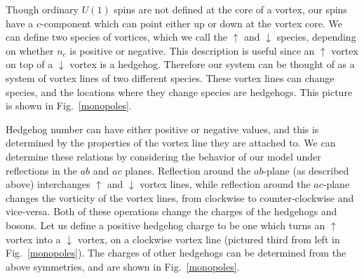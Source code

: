 \documentclass[prb,twocolumn]{revtex4-1}
\begin{document}

Though ordinary $U(1)$ spins are not defined at the core of a vortex, our spins have a $c$-component which can point either up or down at the vortex core. We can define two species of vortices, which we call the $\uparrow$ and $\downarrow$ species, depending on whether $n_c$ is positive or negative. This description is useful since an $\uparrow$ vortex on top of a $\downarrow$ vortex is a hedgehog. Therefore our system can be thought of as a system of vortex lines of two different species. These vortex lines can change species, and the locations where they change species are hedgehogs. This picture is shown in Fig.~\ref{monopoles}.

Hedgehog number can have either positive or negative values, and this is determined by the properties of the vortex line they are attached to. 
We can determine these relations by considering the behavior of our model under reflections in the $ab$ and $ac$ planes. 
Reflection around the $ab$-plane (as described above) interchanges $\uparrow$ and $\downarrow$ vortex lines, while reflection around the $ac$-plane changes the vorticity of the vortex lines, from clockwise to counter-clockwise and vice-versa. Both of these operations change the charges of the hedgehogs and bosons.
Let us define a positive hedgehog charge to be one which turns an $\uparrow$ vortex into a $\downarrow$ vortex, on a clockwise vortex line (pictured third from left in Fig.~\ref{monopoles}). The charges of other hedgehogs can be determined from the above symmetries, and are shown in Fig.~\ref{monopoles}. 
\end{document}
